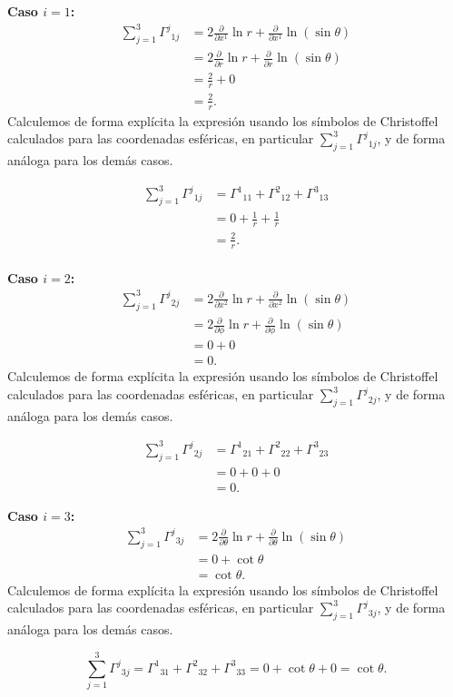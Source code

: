\documentclass[../apunte_mecanica_clasica.tex]{subfiles}%
\begin{document}
\begin{apuntebloque}{}

\bigskip
\textbf{Caso $i=1$:}
\begin{align*}
    \sum_{j=1}^3 \Gamma^j{}_{1j}
    &= 2 \frac{\partial}{\partial x^1} \ln r 
       + \frac{\partial}{\partial x^1} \ln (\sin\theta) \\
    &= 2 \frac{\partial}{\partial r} \ln r 
       + \frac{\partial}{\partial r} \ln (\sin\theta) \\
    &= \frac{2}{r} + 0 \\[6pt]
    &= \frac{2}{r}.
\end{align*}
Calculemos de forma explícita la expresión usando los símbolos de Christoffel 
calculados para las coordenadas esféricas, en particular 
$\sum_{j=1}^3 \Gamma^j{}_{1j}$, y de forma análoga para los demás casos.

\begin{align*}
    \sum_{j=1}^3 \Gamma^j{}_{1j}
    &= \Gamma^1{}_{11} + \Gamma^2{}_{12} + \Gamma^3{}_{13} \\
    &= 0 + \frac{1}{r} + \frac{1}{r} \\
    &= \frac{2}{r}. \\
\end{align*}

\textbf{Caso $i=2$:}
\begin{align*}
    \sum_{j=1}^3 \Gamma^j{}_{2j}
    &= 2 \frac{\partial}{\partial x^2} \ln r 
       + \frac{\partial}{\partial x^2} \ln (\sin\theta) \\
    &= 2 \frac{\partial}{\partial \phi} \ln r 
       + \frac{\partial}{\partial \phi} \ln (\sin\theta) \\
    &= 0 + 0 \\[4pt]
    &= 0.
\end{align*}
Calculemos de forma explícita la expresión usando los símbolos de Christoffel 
calculados para las coordenadas esféricas, en particular 
$\sum_{j=1}^3 \Gamma^j{}_{2j}$, y de forma análoga para los demás casos.

\begin{align*}
    \sum_{j=1}^3 \Gamma^j{}_{2j}
    &= \Gamma^1{}_{21} + \Gamma^2{}_{22} + \Gamma^3{}_{23}\\
    &= 0 + 0 + 0 \\[4pt]
    &= 0.
\end{align*}

\textbf{Caso $i=3$:}
\begin{align*}
    \sum_{j=1}^3 \Gamma^j{}_{3j}
    &= 2 \frac{\partial}{\partial \theta} \ln r 
       + \frac{\partial}{\partial \theta} \ln (\sin\theta) \\[4pt]
    &= 0 + \cot\theta \\[4pt]
    &= \cot\theta.
\end{align*}
Calculemos de forma explícita la expresión usando los símbolos de Christoffel 
calculados para las coordenadas esféricas, en particular 
$\sum_{j=1}^3 \Gamma^j{}_{3j}$, y de forma análoga para los demás casos.

\[
    \sum_{j=1}^3 \Gamma^j{}_{3j}
    = \Gamma^1{}_{31} + \Gamma^2{}_{32} + \Gamma^3{}_{33}
    = 0 + \cot\theta + 0 = \cot\theta.
\]

\end{apuntebloque}


\newpage
\end{document}
